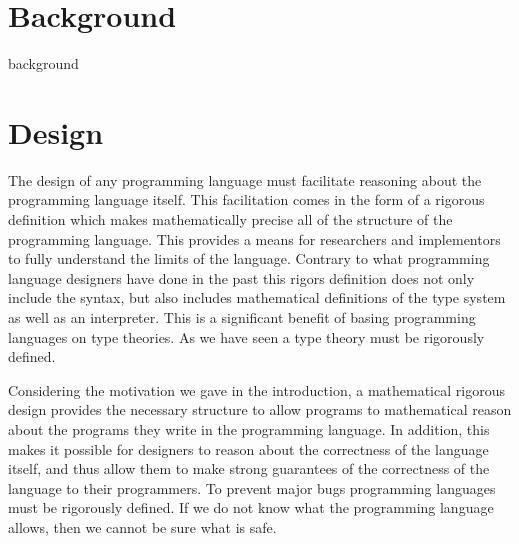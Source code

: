 \documentclass[phd,appendix,dedicationpage,ackpage,epigraphpage]{uithesis}
\begin{document}
\part{Background}          
\label{part:background}
{background}

\part{Design}
\label{part:design}
The design of any programming language must facilitate reasoning about
the programming language itself.  This facilitation comes in the form
of a rigorous definition which makes mathematically precise all of the
structure of the programming language.  This provides a means for
researchers and implementors to fully understand the limits of the
language.  Contrary to what programming language designers have done
in the past this rigors definition does not only include the syntax,
but also includes mathematical definitions of the type system as well
as an interpreter. This is a significant benefit of basing programming
languages on type theories.  As we have seen a type theory must be
rigorously defined.  

Considering the motivation we gave in the introduction, a mathematical
rigorous design provides the necessary structure to allow programs to
mathematical reason about the programs they write in the programming
language.  In addition, this makes it possible for designers to reason
about the correctness of the language itself, and thus allow them to
make strong guarantees of the correctness of the language to their
programmers.  To prevent major bugs programming languages must be
rigorously defined.  If we do not know what the programming language
allows, then we cannot be sure what is safe.
\end{document}
